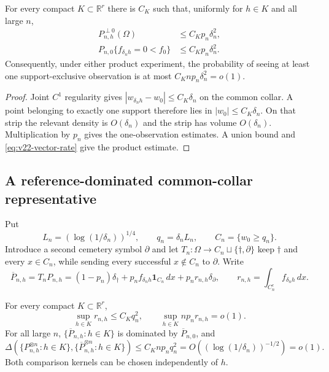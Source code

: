 \begin{lemma}
\label{lem:v22-support-decomposition}
For every compact $K\subset\mathbb R^r$ there is $C_K$ such that, uniformly
for $h\in K$ and all large $n$,
\begin{align}
 P_{n,h}^{\perp0}(\Omega)&\le C_Kp_n\delta_n^2,
                                      \label{eq:v22-alt-singular-mass}\\
 P_{n,0}\{f_{\delta_nh}=0<f_0\}&\le C_Kp_n\delta_n^2.
                                      \label{eq:v22-null-exclusive-mass}
\end{align}
Consequently, under either product experiment, the probability of seeing at
least one support-exclusive observation is at most
$C_Knp_n\delta_n^2=o(1)$.
\end{lemma}

\begin{proof}
Joint $C^1$ regularity gives
$|w_{\delta_nh}-w_0|\le C_K\delta_n$ on the common collar.  A point belonging
to exactly one support therefore lies in $|w_0|\le C_K\delta_n$.  On that
strip the relevant density is $O(\delta_n)$ and the strip has volume
$O(\delta_n)$.  Multiplication by $p_n$ gives the one-observation estimates.
A union bound and \eqref{eq:v22-vector-rate} give the product estimate.
\end{proof}

\subsection{A reference-dominated common-collar representative}

Put
\begin{equation}\label{eq:v22-truncation-scale}
 L_n=(\log(1/\delta_n))^{1/4},\qquad
 q_n=\delta_nL_n,\qquad C_n=\{w_0\ge q_n\}.
\end{equation}
Introduce a second cemetery symbol $\partial$ and let
$T_n:\Omega\to C_n\sqcup\{\dagger,\partial\}$ keep $\dagger$ and every
$x\in C_n$, while sending every successful $x\notin C_n$ to $\partial$.
Write
\begin{equation}\label{eq:v22-censored-law}
 \overline P_{n,h}=T_nP_{n,h}
 =(1-p_n)\delta_\dagger
 +p_nf_{\delta_nh}\mathbf1_{C_n}\,dx
 +p_nr_{n,h}\delta_\partial,
 \qquad
 r_{n,h}=\int_{C_n^c}f_{\delta_nh}\,dx.
\end{equation}

\begin{lemma}
\label{lem:v22-common-collar-equivalence}
For every compact $K\subset\mathbb R^r$,
\begin{equation}\label{eq:v22-collar-mass}
 \sup_{h\in K}r_{n,h}\le C_Kq_n^2,
 \qquad
 \sup_{h\in K}np_nr_{n,h}=o(1).
\end{equation}
For all large $n$, $\{\overline P_{n,h}:h\in K\}$ is dominated by
$\overline P_{n,0}$, and
\begin{equation}\label{eq:v22-lecam-censoring}
 \Delta\!\left(
  \{P_{n,h}^{\otimes n}:h\in K\},
  \{\overline P_{n,h}^{\otimes n}:h\in K\}
 \right)
 \le C_Knp_nq_n^2
 =O((\log(1/\delta_n))^{-1/2})=o(1).
\end{equation}
Both comparison kernels can be chosen independently of $h$.
\end{lemma}

